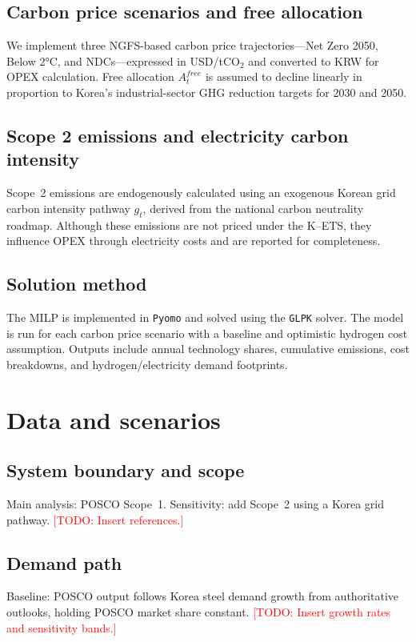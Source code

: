\documentclass[preprint,5p,authoryear]{elsarticle}
\newcommand{\todo}[1]{\textcolor{red}{[TODO: #1]}}
\begin{document}
\subsection{Carbon price scenarios and free allocation}
We implement three NGFS-based carbon price trajectories—Net Zero 2050, Below 2°C, and NDCs—expressed in USD/tCO$_2$ and converted to KRW for OPEX calculation. Free allocation $A^{free}_t$ is assumed to decline linearly in proportion to Korea's industrial-sector GHG reduction targets for 2030 and 2050.

\subsection{Scope 2 emissions and electricity carbon intensity}
Scope~2 emissions are endogenously calculated using an exogenous Korean grid carbon intensity pathway $g_t$, derived from the national carbon neutrality roadmap. Although these emissions are not priced under the K--ETS, they influence OPEX through electricity costs and are reported for completeness.

\subsection{Solution method}
The MILP is implemented in \texttt{Pyomo} and solved using the \texttt{GLPK} solver. The model is run for each carbon price scenario with a baseline and optimistic hydrogen cost assumption. Outputs include annual technology shares, cumulative emissions, cost breakdowns, and hydrogen/electricity demand footprints.

\section{Data and scenarios}
\subsection{System boundary and scope}
Main analysis: POSCO Scope~1. Sensitivity: add Scope~2 using a Korea grid pathway. \todo{Insert references.}

\subsection{Demand path}
Baseline: POSCO output follows Korea steel demand growth from authoritative outlooks, holding POSCO market share constant. \todo{Insert growth rates and sensitivity bands.}
\end{document}
